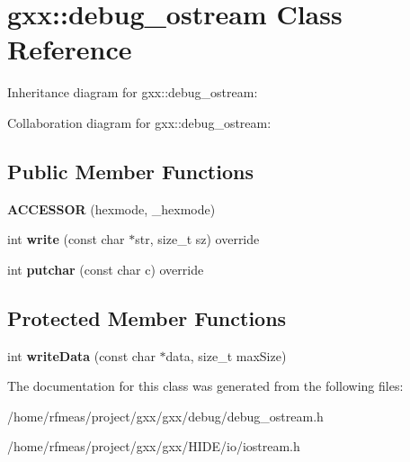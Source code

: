 \hypertarget{classgxx_1_1debug__ostream}{}\section{gxx\+:\+:debug\+\_\+ostream Class Reference}
\label{classgxx_1_1debug__ostream}


Inheritance diagram for gxx\+:\+:debug\+\_\+ostream\+:


Collaboration diagram for gxx\+:\+:debug\+\_\+ostream\+:
\subsection*{Public Member Functions}
\begin{DoxyCompactItemize}
\item 
{\bfseries A\+C\+C\+E\+S\+S\+OR} (hexmode, \+\_\+hexmode)\hypertarget{classgxx_1_1debug__ostream_a26f05c9a368bfa5fbfaf429793f1b852}{}\label{classgxx_1_1debug__ostream_a26f05c9a368bfa5fbfaf429793f1b852}

\item 
int {\bfseries write} (const char $\ast$str, size\+\_\+t sz) override\hypertarget{classgxx_1_1debug__ostream_af320da6e96d352b36e69cdf9ad5a066c}{}\label{classgxx_1_1debug__ostream_af320da6e96d352b36e69cdf9ad5a066c}

\item 
int {\bfseries putchar} (const char c) override\hypertarget{classgxx_1_1debug__ostream_abc694d8fbedd07135143cdd068aae343}{}\label{classgxx_1_1debug__ostream_abc694d8fbedd07135143cdd068aae343}

\end{DoxyCompactItemize}
\subsection*{Protected Member Functions}
\begin{DoxyCompactItemize}
\item 
int {\bfseries write\+Data} (const char $\ast$data, size\+\_\+t max\+Size)\hypertarget{classgxx_1_1debug__ostream_ab0d598e63b09f75a583a9212394ade79}{}\label{classgxx_1_1debug__ostream_ab0d598e63b09f75a583a9212394ade79}

\end{DoxyCompactItemize}


The documentation for this class was generated from the following files\+:\begin{DoxyCompactItemize}
\item 
/home/rfmeas/project/gxx/gxx/debug/debug\+\_\+ostream.\+h\item 
/home/rfmeas/project/gxx/gxx/\+H\+I\+D\+E/io/iostream.\+h\end{DoxyCompactItemize}
